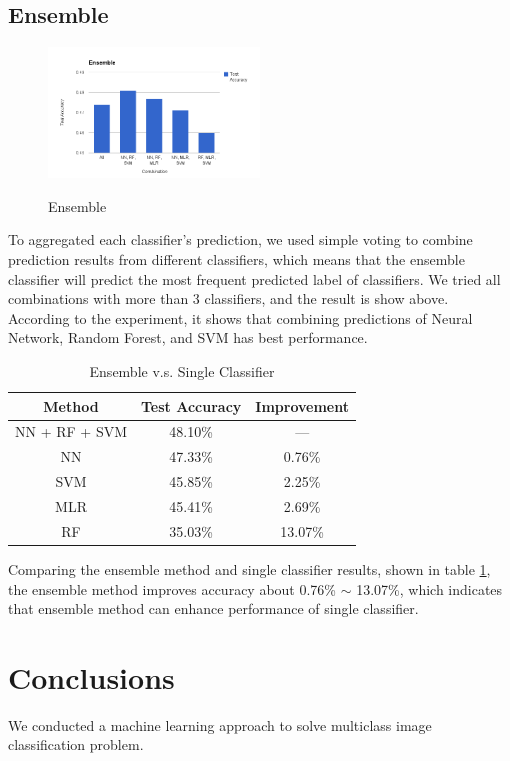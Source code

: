 \documentclass{acm_proc_article-sp}
\begin{document}
\subsection{Ensemble}

\begin{figure}[h!]
  \caption{Ensemble}
  \centering
    \includegraphics[width=0.5\textwidth]{pic/ensemble}
    \label{ensemble}
\end{figure}

To aggregated each classifier’s prediction, we used simple voting to combine prediction results from different classifiers, which means that the ensemble classifier will predict the most frequent predicted label of classifiers. We tried all combinations with more than 3 classifiers, and the result is show above. According to the experiment, it shows that combining predictions of Neural Network, Random Forest, and SVM has best performance. 

\begin{table}[h]
\caption{Ensemble v.s. Single Classifier}
\begin{tabular}{|c|c|c|}
\hline
 \textbf{Method}  & \textbf{Test Accuracy} & \textbf{Improvement}  \\ \hline
 NN + RF + SVM & 48.10\% & ---  \\ \hline
 NN & 47.33\% & 0.76\% \\ \hline
 SVM  & 45.85\% & 2.25\% \\ \hline
 MLR & 45.41\% & 2.69\% \\ \hline
 RF & 35.03\% & 13.07\% \\ \hline
\end{tabular}
\label{ensemble_table}
\end{table}

Comparing the ensemble method and single classifier results, shown in table \ref{ensemble_table}, the ensemble method improves accuracy about 0.76\% $\sim$ 13.07\%, which indicates that ensemble method can enhance performance of single classifier. 

\section{Conclusions}
We conducted a machine learning approach to solve multiclass image classification problem.
\end{document}
